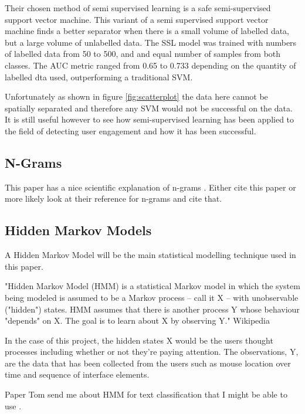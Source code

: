 \documentclass{article}
\begin{document}
Their chosen method of semi supervised learning is a safe semi-supervised support vector machine.
This variant of a semi supervised support vector machine finds a better separator when there is a small volume of labelled data, but a large volume of unlabelled data.
The SSL model was trained with numbers of labelled data from 50 to 500, and and equal number of samples from both classes.
The AUC metric ranged from 0.65 to 0.733 depending on the quantity of labelled dta used, outperforming a traditional SVM.

Unfortunately as shown in figure \ref{fig:scatterplot} the data here cannot be spatially separated and therefore any SVM would not be successful on the data. 
It is still useful however to see how semi-supervised learning has been applied to the field of detecting user engagement and how it has been successful.

\subsection{N-Grams}
This paper has a nice scientific explanation of n-grams \cite{tomovic2006n}.
Either cite this paper or more likely look at their reference for n-grams and cite that.

\subsection{Hidden Markov Models}


A Hidden Markov Model will be the main statistical modelling technique used in this paper.

"Hidden Markov Model (HMM) is a statistical Markov model in which the system being modeled is assumed to be a Markov process – call it X – with unobservable ("hidden") states. 
HMM assumes that there is another process Y whose behaviour "depends" on X.
The goal is to learn about X by observing Y." Wikipedia

In the case of this project, the hidden states X would be the users thought processes including whether or not they're paying attention.
The observations, Y, are the data that has been collected from the users such as mouse location over time and sequence of interface elements.

Paper Tom send me about HMM for text classification that I might be able to use \cite{collins2016tagging}.
\end{document}
